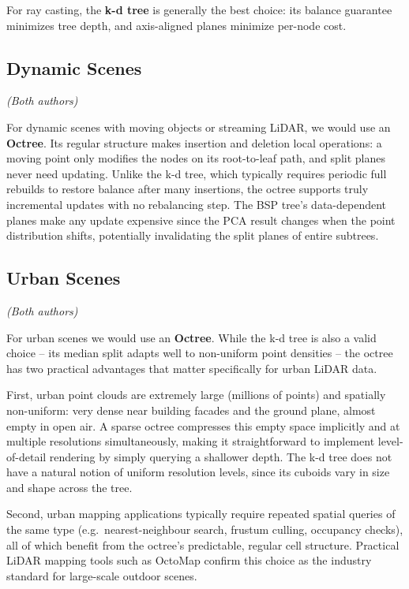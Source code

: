 \documentclass[12pt,a4paper]{article}
\begin{document}
For ray casting, the \textbf{k-d tree} is generally the best choice: its
balance guarantee minimizes tree depth, and axis-aligned planes minimize
per-node cost.

\subsection{Dynamic Scenes}
\textit{(Both authors)}

For dynamic scenes with moving objects or streaming LiDAR, we would use an
\textbf{Octree}. Its regular structure makes insertion and deletion local
operations: a moving point only modifies the nodes on its root-to-leaf path,
and split planes never need updating. Unlike the k-d tree, which typically requires periodic full rebuilds to restore
balance after many insertions, the octree supports truly incremental updates
with no rebalancing step. The BSP tree's data-dependent planes make any update
expensive since the PCA result changes when the point distribution shifts,
potentially invalidating the split planes of entire subtrees.
\subsection{Urban Scenes}
\textit{(Both authors)}

For urban scenes we would use an \textbf{Octree}. While the k-d tree is also a
valid choice -- its median split adapts well to non-uniform point densities --
the octree has two practical advantages that matter specifically for urban
LiDAR data.

First, urban point clouds are extremely large (millions of points) and
spatially non-uniform: very dense near building facades and the ground plane,
almost empty in open air. A sparse octree compresses this empty space
implicitly and at multiple resolutions simultaneously, making it straightforward
to implement level-of-detail rendering by simply querying a shallower depth.
The k-d tree does not have a natural notion of uniform resolution levels,
since its cuboids vary in size and shape across the tree.

Second, urban mapping applications typically require repeated spatial queries
of the same type (e.g.\ nearest-neighbour search, frustum culling, occupancy
checks), all of which benefit from the octree's predictable, regular cell
structure. Practical LiDAR mapping tools such as OctoMap confirm this choice
as the industry standard for large-scale outdoor scenes.

\end{document}
